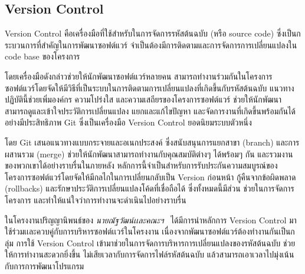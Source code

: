 \documentclass[12pt,oneside,openright,a4paper]{cpe-thai-project}
\begin{document}
    \subsection{Version Control}
        \begin{flushleft}
        Version Control คือเครื่องมือที่ใช้สำหรับในการจัดการรหัสต้นฉบับ (หรือ source code) ซึ่งเป็นกระบวนการที่สำคัญในการพัฒนาซอฟต์แวร์ จำเป็นต้องมีการติดตามและการจัดการการเปลี่ยนแปลงใน code base ของโครงการ~\cite{nattawat20}
        \end{flushleft}
        \begin{flushleft}
        โดยเครื่องมือดังกล่าวช่วยให้นักพัฒนาซอฟต์แวร์หลายคน สามารถทำงานร่วมกันในโครงการซอฟต์แวร์โดยจัดให้มีวิธีที่เป็นระบบในการติดตามการเปลี่ยนแปลงที่เกิดขึ้นกับรหัสต้นฉบับ แนวทางปฏิบัตินี้ช่วยเพิ่มองค์กร ความโปร่งใส และความเสถียรของโครงการซอฟต์แวร์ ช่วยให้นักพัฒนาสามารถดูและเข้าใจประวัติการเปลี่ยนแปลง แยกและแก้ไขปัญหา และจัดการงานที่เกิดขึ้นพร้อมกันได้อย่างมีประสิทธิภาพ Git ซึ่งเป็นเครื่องมือ Version Control ยอดนิยมระบบตัวหนึ่ง~\cite{chacon14}
        \end{flushleft}
        \begin{flushleft}
        โดย Git เสนอแนวทางแบบกระจายและอเนกประสงค์ ซึ่งสนับสนุนการแยกสาขา (branch) และการผสานรวม (merge) ช่วยให้นักพัฒนาสามารถทำงานกับคุณสมบัติต่างๆ ได้พร้อมๆ กัน และรวมงานของพวกเขาได้อย่างราบรื่นในภายหลัง หลักการนี้จำเป็นสำหรับการรับประกันความสมบูรณ์ของโครงการซอฟต์แวร์โดยจัดให้มีกลไกในการเปลี่ยนกลับเป็น Version ก่อนหน้า กู้คืนจากข้อผิดพลาด (rollbacks) และรักษาประวัติการเปลี่ยนแปลงโค้ดที่เชื่อถือได้ ซึ่งทั้งหมดนี้มีส่วน ช่วยในการจัดการโครงการ และทำให้แน่ใจว่าการทำงานจะดำเนินไปอย่างราบรื่น
        \end{flushleft}
        \begin{flushleft}
        ในโครงงานปริญญานิพนธ์ของ \textit{นายณัฐวัฒน์เเละคณะฯ}~\cite{nattawat20} ได้มีการนำหลักการ Version Control มาใช้ร่วมเเละควบคู่กับการบริหารซอฟต์เเวร์ในโครงงาน เนื่องจากพัฒนาซอฟต์แวร์ต้องทำงานกันเป็นกลุ่ม การใช้ Version Control เข้ามาช่วยในการจัดการบริหารการเปลี่ยนแปลงของรหัสต้นฉบับ ช่วยให้การทำงานสะดวกยิ่งขึ้น ไม่เสียเวลากับการจัดการไฟล์รหัสต้นฉบับ แล้วสามารถเอาเวลาไปมุ่งเน้นกับการการพัฒนาโปรแกรม
        \end{flushleft}
\end{document}
